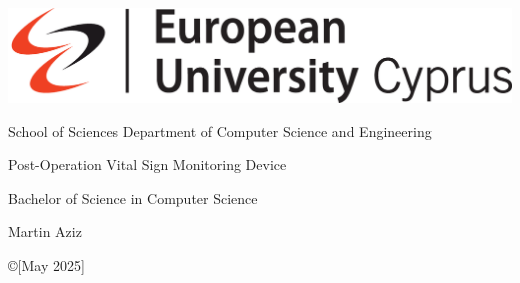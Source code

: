 \thispagestyle{empty}
{

\noindent\includegraphics[scale=0.32]{images/euc.jpg}


\begin{center}
 School of Sciences \textbar \; Department of Computer Science and Engineering
\end{center}

\vspace{1.5cm}
\begin{center}
\Huge  Post-Operation Vital Sign Monitoring Device
\end{center}



\vspace{1.5cm}
\begin{center}\LARGE Bachelor of Science in Computer Science
\end{center}


\vspace{1.5cm}
\begin{center}
\Large Martin Aziz
\end{center}
\vspace{1.5cm}

\noindent
\begin{center}\copyright  [May 2025]
\end{center}
\newpage
\thispagestyle{empty}

}%
